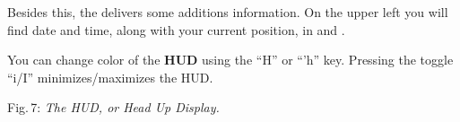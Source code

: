 Besides this, the  delivers some additions information. On the upper
left you will find date and time, along with your current position, in 
and .

You can change color of the \textbf{HUD} using the ``H'' or ``'h''  key.
Pressing the toggle ``i/I'' minimizes/maximizes the HUD.

\medskip

 \centerline{}

\smallskip
 \noindent
Fig.\,7: \textit{The HUD, or Head Up Display.}
\medskip

